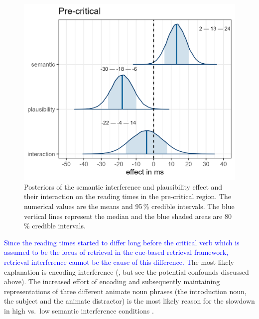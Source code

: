\documentclass[review,preprint,12pt,authoryear,floatsintext]{elsarticle}
\begin{document}
\begin{figure}[ht]
    \centering
        \caption{Posteriors of the semantic interference and plausibility effect and their interaction on the reading times in the pre-critical region. The numerical values are the means and 95\,\% credible intervals. The blue vertical lines represent the median and the blue shaded areas are 80\,\% credible intervals.}\label{fig:posteriors_plausibility}
    \includegraphics[width=0.8\linewidth]{posteriors_spr_pooled_774_plausibility.png}
\end{figure}

\textcolor{blue}{Since the reading times started to differ long before the critical verb which is assumed to be the locus of retrieval in the cue-based retrieval framework,  retrieval interference cannot be the cause of this difference. T}he most likely explanation is encoding interference (\cite{Oberauer_Kliegl_2006}, but see the potential confounds discussed above). The increased effort of encoding and subsequently maintaining representations of three different animate noun phrases (the introduction noun, the subject and the animate distractor) is the most likely reason for the slowdown in high vs.\ low semantic interference conditions \citep[for similar findings, see e.g., ][]{lago_etal_2021, ness2019, ness2017, kush_etal_2015, gordon02}. 

\label{previous_encoding}
\end{document}
